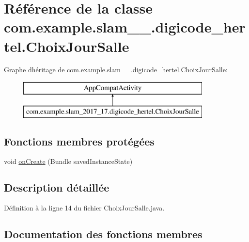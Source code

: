 \hypertarget{classcom_1_1example_1_1slam__2017__17_1_1digicode__hertel_1_1_choix_jour_salle}{}\section{Référence de la classe com.\+example.\+slam\+\_\+\_.\+digicode\+\_\+hertel.\+Choix\+Jour\+Salle}
\label{classcom_1_1example_1_1slam__2017__17_1_1digicode__hertel_1_1_choix_jour_salle}
Graphe d\textquotesingle{}héritage de com.\+example.\+slam\+\_\+\_.\+digicode\+\_\+hertel.\+Choix\+Jour\+Salle\+:\begin{figure}[H]
\begin{center}
\leavevmode
\includegraphics[height=2.000000cm]{classcom_1_1example_1_1slam__2017__17_1_1digicode__hertel_1_1_choix_jour_salle}
\end{center}
\end{figure}
\subsection*{Fonctions membres protégées}
\begin{DoxyCompactItemize}
\item 
void \hyperlink{classcom_1_1example_1_1slam__2017__17_1_1digicode__hertel_1_1_choix_jour_salle_a6d0887f1fed1de0ba657629c0cf181c5}{on\+Create} (Bundle saved\+Instance\+State)
\end{DoxyCompactItemize}


\subsection{Description détaillée}


Définition à la ligne 14 du fichier Choix\+Jour\+Salle.\+java.



\subsection{Documentation des fonctions membres}
\hypertarget{classcom_1_1example_1_1slam__2017__17_1_1digicode__hertel_1_1_choix_jour_salle_a6d0887f1fed1de0ba657629c0cf181c5}{}
